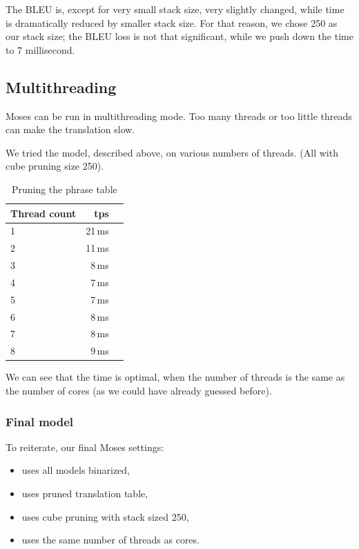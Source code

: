 The BLEU is, except for very small stack size, very slightly changed, while time is dramatically reduced by smaller stack size. For that reason, we chose 250 as our stack size; the BLEU loss is not that significant, while we push down the time to 7 millisecond.

\subsection{Multithreading}
Moses can be run in multithreading mode. Too many threads or too little threads can make the translation slow.

We tried the model, described above, on various numbers of threads. (All with cube pruning size 250).

\begin{table}[h]
\begin{center}
\begin{tabular}{|l|r|r|}
    \hline
    \textbf{Thread count} &  \textbf{tps}  \\ \hline
    1 & 21\,ms \\ \hline
    2 & 11\,ms \\ \hline
    3 & 8\,ms \\ \hline
    4 & 7\,ms \\ \hline
    5 & 7\,ms \\ \hline
    6 & 8\,ms \\ \hline
    7 & 8\,ms \\ \hline
    8 & 9\,ms \\ \hline
    
\end{tabular}
\end{center}
\caption{Pruning the phrase table}\label{moses:tablepruning}
\end{table}


We can see that the time is optimal, when the number of threads is the same as the number of cores (as we could have already guessed before).

\subsubsection*{Final model}
To reiterate, our final Moses settings:
\begin{itemize}
    \item uses all models binarized,
    \item uses pruned translation table,
    \item uses cube pruning with stack sized 250,
    \item uses the same number of threads as cores.
\end{itemize}

